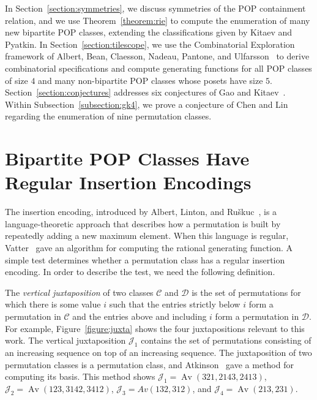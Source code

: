 \documentclass[11pt]{article}
\theoremstyle{definition}
\numberwithin{theorem}{section}
\numberwithin{question}{section}
\numberwithin{definition}{section}
\numberwithin{example}{section}
\numberwithin{remark}{section}
\newcommand{\Av}{\operatorname{Av}}
\newcommand{\CC}{\mathcal{C}}
\newcommand{\DD}{\mathcal{D}}
\newcommand{\JJ}{\mathcal{J}}
\begin{document}
In Section~\ref{section:symmetries}, we discuss symmetries of the POP containment relation, and we use Theorem~\ref{theorem:rie} to compute the enumeration of many new bipartite POP classes, extending the classifications given by Kitaev and Pyatkin. In Section~\ref{section:tilescope}, we use the Combinatorial Exploration framework of Albert, Bean, Claesson, Nadeau, Pantone, and Ulfarsson~\cite{combinatorial-exploration} to derive combinatorial specifications and compute generating functions for all POP classes of size $4$ and many non-bipartite POP classes whose posets have size $5$. Section~\ref{section:conjectures} addresses six conjectures of Gao and Kitaev~\cite{gao:partially-ordered-patterns}. Within Subsection~\ref{subsection:gk4}, we prove a conjecture of Chen and Lin~\cite{chen:length-5-patts-and-inv-201-210} regarding the enumeration of nine permutation classes.


\section{Bipartite POP Classes Have Regular Insertion Encodings}
\label{section:rie}

The insertion encoding, introduced by Albert, Linton, and Ru\v{s}kuc~\cite{albert:insertion-encoding}, is a language-theoretic approach that describes how a permutation is built by repeatedly adding a new maximum element. When this language is regular, Vatter~\cite{vatter:regular-insertion-encoding} gave an algorithm for computing the rational generating function. A simple test determines whether a permutation class has a regular insertion encoding. In order to describe the test, we need the following definition.

The \emph{vertical juxtaposition} of two classes $\CC$ and $\DD$ is the set of permutations for which there is some value $i$ such that the entries strictly below $i$ form a permutation in $\CC$ and the entries above and including $i$ form a permutation in $\DD$. For example, Figure~\ref{figure:juxta} shows the four juxtapositions relevant to this work. The vertical juxtaposition $\JJ_1$ contains the set of permutations consisting of an increasing sequence on top of an increasing sequence. The juxtaposition of two permutation classes is a permutation class, and Atkinson~\cite{atkinson:restricted-perms} gave a method for computing its basis. This method shows $\JJ_1 = \Av(321, 2143, 2413)$, $\JJ_2 = \Av(123, 3142, 3412)$, $\JJ_3 = Av(132, 312)$, and $\JJ_4 = \Av(213, 231)$.
\end{document}
